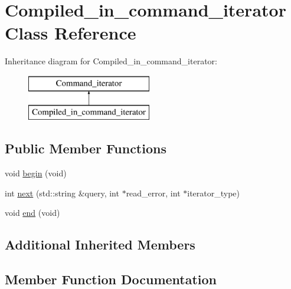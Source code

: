 \hypertarget{classCompiled__in__command__iterator}{}\section{Compiled\+\_\+in\+\_\+command\+\_\+iterator Class Reference}
\label{classCompiled__in__command__iterator}
Inheritance diagram for Compiled\+\_\+in\+\_\+command\+\_\+iterator\+:\begin{figure}[H]
\begin{center}
\leavevmode
\includegraphics[height=2.000000cm]{classCompiled__in__command__iterator}
\end{center}
\end{figure}
\subsection*{Public Member Functions}
\begin{DoxyCompactItemize}
\item 
void \mbox{\hyperlink{classCompiled__in__command__iterator_ad68f7ccc260a9c316fb5f4970021ce04}{begin}} (void)
\item 
int \mbox{\hyperlink{classCompiled__in__command__iterator_ab39e0e08ac52836b136a0ec82f53a084}{next}} (std\+::string \&query, int $\ast$read\+\_\+error, int $\ast$iterator\+\_\+type)
\item 
void \mbox{\hyperlink{classCompiled__in__command__iterator_a462b9632e92198deea287c08331a9137}{end}} (void)
\end{DoxyCompactItemize}
\subsection*{Additional Inherited Members}


\subsection{Member Function Documentation}
\mbox{\label{classCompiled__in__command__iterator_ad68f7ccc260a9c316fb5f4970021ce04}} 
